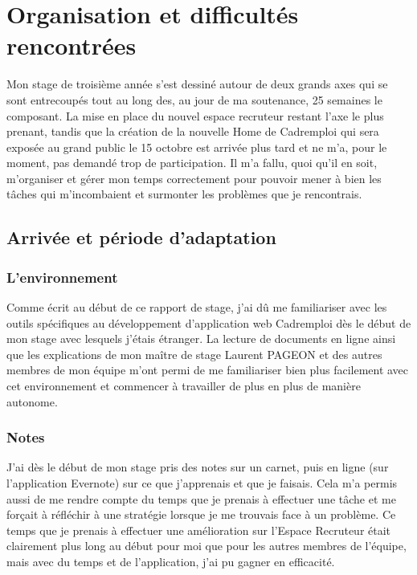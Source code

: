 
\chapter{Organisation et difficultés rencontrées} %

\label{difficultes} %


Mon stage de troisième année s'est dessiné autour de deux grands axes qui se sont entrecoupés tout au long des, au jour de ma soutenance, 25 semaines le composant.
La mise en place du nouvel espace recruteur restant l'axe le plus prenant, tandis que la création de la nouvelle Home de Cadremploi qui sera exposée au grand public le 15 octobre est arrivée plus tard et ne m'a, pour le moment, pas demandé trop de participation.
Il m'a fallu, quoi qu'il en soit, m'organiser et gérer mon temps correctement pour pouvoir mener à bien les tâches qui m'incombaient et surmonter les problèmes que je rencontrais.

\section{Arrivée et période d'adaptation}
\subsection{L'environnement}
Comme écrit au début de ce rapport de stage, j'ai dû me familiariser avec les outils spécifiques au développement d'application web Cadremploi dès le début de mon stage avec lesquels j'étais étranger.
La lecture de documents en ligne ainsi que les explications de mon maître de stage Laurent PAGEON et des autres membres de mon équipe m'ont permi de me familiariser bien plus facilement avec cet environnement et commencer à travailler de plus en plus de manière autonome.
\subsection{Notes}
J'ai dès le début de mon stage pris des notes sur un carnet, puis en ligne (sur l'application Evernote) sur ce que j'apprenais et que je faisais.
Cela m'a permis aussi de me rendre compte du temps que je prenais à effectuer une tâche et me forçait à réfléchir à une stratégie lorsque je me trouvais face à un problème.
Ce temps que je prenais à effectuer une amélioration sur l'Espace Recruteur était clairement plus long au début pour moi que pour les autres membres de l'équipe, mais avec du temps et de l'application, j'ai pu gagner en efficacité.
